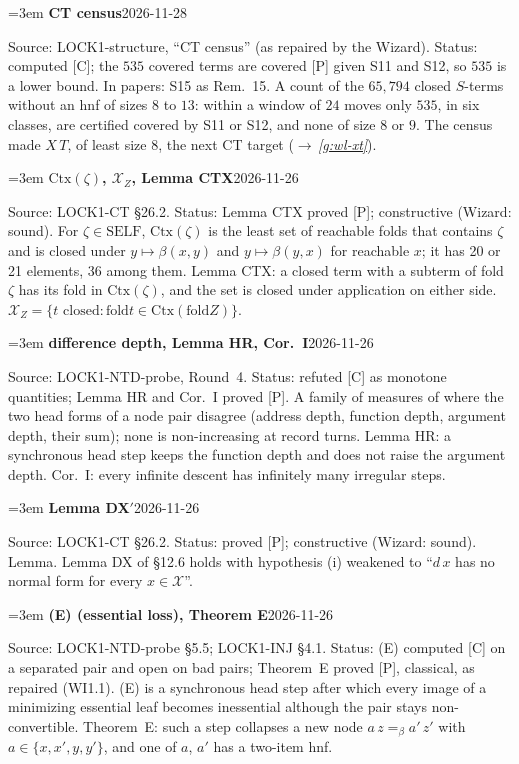 \documentclass[11pt]{amsart}
\makeatletter
\newcommand{\conv}{=_\beta}
\newcommand{\fold}{\mathrm{fold}}
\newcommand{\Self}{\mathrm{SELF}}
\newcounter{sense}
\newenvironment{entry}[3]{%
  \par\addvspace{\medskipamount}\noindent\phantomsection
  \def\@currentlabel{#2}\label{#1}\setcounter{sense}{0}\raggedright\emergencystretch=3em%
  \textbf{#2}\hfill{\footnotesize\textsf{#3}}\par\nopagebreak\noindent\ignorespaces}%
  {\par}
\newcommand{\src}[1]{\textsf{Source:} #1.\enskip}
\newcommand{\status}[1]{\textsf{Status:} #1.\enskip}
\newcommand{\appears}[1]{\textsf{In papers:} #1.\enskip}
\renewcommand{\see}[1]{$\rightarrow$\,\emph{\ref{#1}}}
\makeatother
\begin{document}
\begin{entry}{g:wl-ct-census}{CT census}{2026-11-28}
\src{LOCK1-structure, ``CT census'' (as repaired by the Wizard)}
\status{computed [C]; the $535$ covered terms are covered [P] given S11 and S12, so $535$ is a lower bound}
\appears{S15 as Rem.~15}
A count of the $65{,}794$ closed $S$-terms without an hnf of sizes $8$ to $13$: within a window of $24$
moves only $535$, in six classes, are certified covered by S11 or S12, and none of size $8$ or $9$. The
census made $X\,T$, of least size $8$, the next CT target (\see{g:wl-xt}).
\end{entry}

\begin{entry}{g:wl-ctx}{$\mathrm{Ctx}(\zeta)$, $\mathcal X_Z$, Lemma CTX}{2026-11-26}
\src{LOCK1-CT \S26.2}
\status{Lemma CTX proved [P]; constructive (Wizard: sound)}
For $\zeta\in\Self$, $\mathrm{Ctx}(\zeta)$ is the least set of reachable folds that contains $\zeta$
and is closed under $y\mapsto\beta(x,y)$ and $y\mapsto\beta(y,x)$ for reachable $x$; it has 20 or 21
elements, 36 among them. Lemma CTX: a closed term with a subterm of fold $\zeta$ has its fold in
$\mathrm{Ctx}(\zeta)$, and the set is closed under application on either side.
$\mathcal X_Z=\{t\text{ closed}:\fold t\in\mathrm{Ctx}(\fold Z)\}$.
\end{entry}

\begin{entry}{g:wl-difference-depth}{difference depth, Lemma HR, Cor.~I}{2026-11-26}
\src{LOCK1-NTD-probe, Round~4}
\status{refuted [C] as monotone quantities; Lemma HR and Cor.~I proved [P]}
A family of measures of where the two head forms of a node pair disagree (address depth, function
depth, argument depth, their sum); none is non-increasing at record turns. Lemma HR: a synchronous
head step keeps the function depth and does not raise the argument depth. Cor.~I: every infinite
descent has infinitely many irregular steps.
\end{entry}

\begin{entry}{g:wl-dxp}{Lemma DX$'$}{2026-11-26}
\src{LOCK1-CT \S26.2}
\status{proved [P]; constructive (Wizard: sound)}
Lemma. Lemma DX of \S12.6 holds with hypothesis (i) weakened to ``$d\,x$ has no normal form for every
$x\in\mathcal X$''.
\end{entry}

\begin{entry}{g:wl-event-e}{(E) (essential loss), Theorem E}{2026-11-26}
\src{LOCK1-NTD-probe \S5.5; LOCK1-INJ \S4.1}
\status{(E) computed [C] on a separated pair and open on bad pairs; Theorem~E proved [P], classical,
as repaired (WI1.1)}
(E) is a synchronous head step after which every image of a minimizing essential leaf becomes
inessential although the pair stays non-convertible. Theorem~E: such a step collapses a new node
$a\,z\conv a'\,z'$ with $a\in\{x,x',y,y'\}$, and one of $a$, $a'$ has a two-item hnf.
\end{entry}
\end{document}
